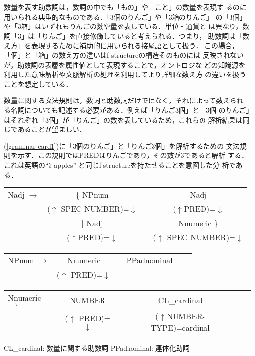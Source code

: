 \documentclass[japanese]{jnlp_1.4}
\begin{document}
数量を表す助数詞は，数詞の中でも「もの」や「こと」の数量を表現す
るのに用いられる典型的なものである．「3個のりんご」や「3箱のりんご」
の「3個」や「3箱」はいずれもりんごの数や量を表している．単位・通貨と
は異なり，数詞「3」は「りんご」を直接修飾していると考えられる．つまり，
助数詞は「数え方」を表現するために補助的に用いられる接尾語として扱う．
この場合，「個」と「箱」の数え方の違いはf-structureの構造そのものには
反映されないが，助数詞の表層を属性値として表現することで，オントロジな
どの知識源を利用した意味解析や文脈解析の処理を利用してより詳細な数え方
の違いを扱うことを想定している．

数量に関する文法規則は，数詞と助数詞だけではなく，それによって数えられ
る名詞についても記述する必要がある．例えば「りんご3個」と「3個
のりんご」はそれぞれ「3個」が「りんご」の数を表しているため，これらの
解析結果は同じであることが望ましい．

(\ref{grammar-card1})に「3個のりんご」と「りんご3個」を解析するための
文法規則を示す．この規則ではPREDはりんごであり，その数が3であると解析
する．これは英語の``3 apples'' と同じf-structureを持たせることを意図した分
析である．

\begin{example}
\label{grammar-card1}
\begin{tabular}[t]{lccc}
Nadj $\longrightarrow$ & \{ NPnum && Nadj\\
&($\uparrow$ SPEC NUMBER)=$\downarrow$ &&($\uparrow$PRED)=$\downarrow$\\[2ex]
& $|$ Nadj && Nnumeric \}\\
&($\uparrow$PRED)=$\downarrow$&&($\uparrow$ SPEC NUMBER)=$\downarrow$\\[2ex]
\end{tabular}

\begin{tabular}[t]{lccccc}
NPnum $\longrightarrow$ & Nnumeric && PPadnominal\\
&($\uparrow$ PRED)=$\downarrow$\hspace*{.3cm} &&\\[2ex]
\end{tabular}

\begin{tabular}[t]{lccccc}
Nnumeric $\longrightarrow$ & NUMBER && CL\_cardinal\\
&($\uparrow$ PRED)=$\downarrow$\hspace*{.3cm} &&($\uparrow$NUMBER-TYPE)=cardinal&&\\[2ex]
\end{tabular}

CL\_cardinal: 数量に関する助数詞 \quad PPadnominal: 連体化助詞
\end{example}
\end{document}
